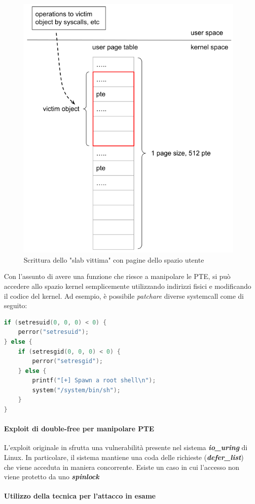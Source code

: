 \documentclass{article}
\begin{document}
\begin{figure}[h]
  \begin{center}
    \includegraphics[width=.5\textwidth]{figures/ch1/pic1_occupy_with_pagetable.png}
  \end{center}
  \caption{Scrittura dello "slab vittima" con pagine dello spazio utente}\label{fig:occupy-dpt}
\end{figure}
Con l'assunto di avere una funzione che riesce a manipolare le PTE, si può accedere 
allo spazio kernel semplicemente utilizzando indirizzi fisici e modificando il codice del kernel. 
Ad esempio, è possibile \textit{patchare} diverse systemcall come di seguito:


\begin{lstlisting}[language=C,style=CStyle,caption="Privilege escalatation con system call modificate dall'attacco"]
if (setresuid(0, 0, 0) < 0) {
    perror("setresuid");
} else {
    if (setresgid(0, 0, 0) < 0) {
        perror("setresgid");
    } else {
        printf("[+] Spawn a root shell\n");
        system("/system/bin/sh");
    }
}
\end{lstlisting}

\paragraph{Exploit di double-free per manipolare PTE} L'exploit originale in \cite{DirtyPageTable}
sfrutta una vulnerabilità presente nel sistema \textbf{\textit{io\_uring}} di Linux. 
In particolare, il sistema mantiene una coda delle richieste (\textbf{\textit{defer\_list}}) 
che viene acceduta in maniera concorrente. Esiste un caso in cui l'accesso non viene protetto 
da uno \textbf{\textit{spinlock}}

\paragraph{Utilizzo della tecnica per l'attacco in esame}
\end{document}
